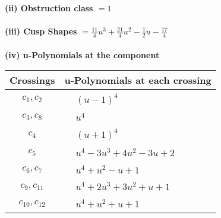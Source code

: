 \documentclass[1p]{elsarticle_modified}
\theoremstyle{definition}
\begin{document}
\flushleft \textbf{(ii) Obstruction class $= 1$}\\~\\
\flushleft \textbf{(iii) Cusp Shapes $= \frac{11}{4} u^3+\frac{21}{4} u^2-\frac{1}{2} u-\frac{17}{4}$}\\~\\
\newpage\renewcommand{\arraystretch}{1}
\flushleft \textbf{(iv) u-Polynomials at the component}\newline \\
\begin{tabular}{m{50pt}|m{274pt}}
Crossings & \hspace{64pt}u-Polynomials at each crossing \\
\hline $$\begin{aligned}c_{1},c_{2}\end{aligned}$$&$\begin{aligned}
&(u-1)^4
\end{aligned}$\\
\hline $$\begin{aligned}c_{3},c_{8}\end{aligned}$$&$\begin{aligned}
&u^4
\end{aligned}$\\
\hline $$\begin{aligned}c_{4}\end{aligned}$$&$\begin{aligned}
&(u+1)^4
\end{aligned}$\\
\hline $$\begin{aligned}c_{5}\end{aligned}$$&$\begin{aligned}
&u^4-3 u^3+4 u^2-3 u+2
\end{aligned}$\\
\hline $$\begin{aligned}c_{6},c_{7}\end{aligned}$$&$\begin{aligned}
&u^4+u^2- u+1
\end{aligned}$\\
\hline $$\begin{aligned}c_{9},c_{11}\end{aligned}$$&$\begin{aligned}
&u^4+2 u^3+3 u^2+u+1
\end{aligned}$\\
\hline $$\begin{aligned}c_{10},c_{12}\end{aligned}$$&$\begin{aligned}
&u^4+u^2+u+1
\end{aligned}$\\
\hline
\end{tabular}\\~\\
\end{document}
